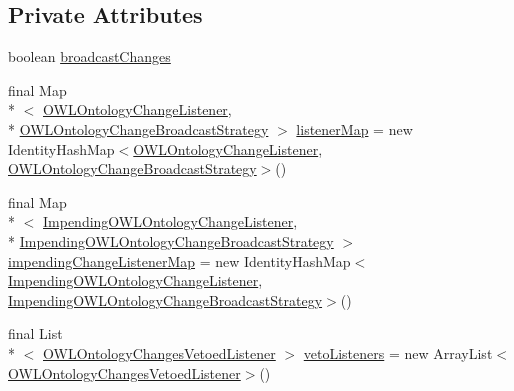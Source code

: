 \subsection*{Private Attributes}
\begin{DoxyCompactItemize}
\item 
boolean \hyperlink{classuk_1_1ac_1_1manchester_1_1cs_1_1owl_1_1owlapi_1_1_o_w_l_ontology_manager_impl_a3c3c778553cd2642a698176f7eeb185e}{broadcast\-Changes}
\item 
final Map\\*
$<$ \hyperlink{interfaceorg_1_1semanticweb_1_1owlapi_1_1model_1_1_o_w_l_ontology_change_listener}{O\-W\-L\-Ontology\-Change\-Listener}, \\*
\hyperlink{interfaceorg_1_1semanticweb_1_1owlapi_1_1model_1_1_o_w_l_ontology_change_broadcast_strategy}{O\-W\-L\-Ontology\-Change\-Broadcast\-Strategy} $>$ \hyperlink{classuk_1_1ac_1_1manchester_1_1cs_1_1owl_1_1owlapi_1_1_o_w_l_ontology_manager_impl_a912da6327d438faa00a305e69a0f479c}{listener\-Map} = new Identity\-Hash\-Map$<$\hyperlink{interfaceorg_1_1semanticweb_1_1owlapi_1_1model_1_1_o_w_l_ontology_change_listener}{O\-W\-L\-Ontology\-Change\-Listener}, \hyperlink{interfaceorg_1_1semanticweb_1_1owlapi_1_1model_1_1_o_w_l_ontology_change_broadcast_strategy}{O\-W\-L\-Ontology\-Change\-Broadcast\-Strategy}$>$()
\item 
final Map\\*
$<$ \hyperlink{interfaceorg_1_1semanticweb_1_1owlapi_1_1model_1_1_impending_o_w_l_ontology_change_listener}{Impending\-O\-W\-L\-Ontology\-Change\-Listener}, \\*
\hyperlink{interfaceorg_1_1semanticweb_1_1owlapi_1_1model_1_1_impending_o_w_l_ontology_change_broadcast_strategy}{Impending\-O\-W\-L\-Ontology\-Change\-Broadcast\-Strategy} $>$ \hyperlink{classuk_1_1ac_1_1manchester_1_1cs_1_1owl_1_1owlapi_1_1_o_w_l_ontology_manager_impl_a9bb1bde755ac8560cc6ef24777e0bfe8}{impending\-Change\-Listener\-Map} = new Identity\-Hash\-Map$<$\hyperlink{interfaceorg_1_1semanticweb_1_1owlapi_1_1model_1_1_impending_o_w_l_ontology_change_listener}{Impending\-O\-W\-L\-Ontology\-Change\-Listener}, \hyperlink{interfaceorg_1_1semanticweb_1_1owlapi_1_1model_1_1_impending_o_w_l_ontology_change_broadcast_strategy}{Impending\-O\-W\-L\-Ontology\-Change\-Broadcast\-Strategy}$>$()
\item 
final List\\*
$<$ \hyperlink{interfaceorg_1_1semanticweb_1_1owlapi_1_1model_1_1_o_w_l_ontology_changes_vetoed_listener}{O\-W\-L\-Ontology\-Changes\-Vetoed\-Listener} $>$ \hyperlink{classuk_1_1ac_1_1manchester_1_1cs_1_1owl_1_1owlapi_1_1_o_w_l_ontology_manager_impl_ad6b6e72c74d97b8c46592a6efb8b7f14}{veto\-Listeners} = new Array\-List$<$\hyperlink{interfaceorg_1_1semanticweb_1_1owlapi_1_1model_1_1_o_w_l_ontology_changes_vetoed_listener}{O\-W\-L\-Ontology\-Changes\-Vetoed\-Listener}$>$()
\end{DoxyCompactItemize}
